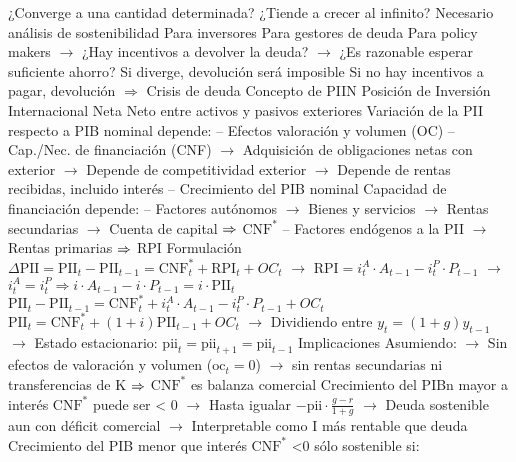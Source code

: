 \documentclass{nuevotema}
\begin{document}
\begin{esquemal}
				\4[] ¿Converge a una cantidad determinada?
				\4[] ¿Tiende a crecer al infinito?
				\4 Necesario análisis de sostenibilidad
				\4[] Para inversores
				\4[] Para gestores de deuda
				\4[] Para policy makers
				\4[] $\to$ ¿Hay incentivos a devolver la deuda?
				\4[] $\to$ ¿Es razonable esperar suficiente ahorro?
				\4[] Si diverge, devolución será imposible
				\4[] Si no hay incentivos a pagar, devolución
				\4[] $\Rightarrow$ Crisis de deuda
				\4 Concepto de PIIN
				\4[] Posición de Inversión Internacional Neta
				\4[] Neto entre activos y pasivos exteriores
				\4 Variación de la PII respecto a PIB nominal depende:
				\4[] -- Efectos valoración y volumen (OC)
				\4[] -- Cap./Nec. de financiación (CNF)
				\4[] $\to$ Adquisición de obligaciones netas con exterior
				\4[] $\to$ Depende de competitividad exterior
				\4[] $\to$ Depende de rentas recibidas, incluido interés
				\4[] -- Crecimiento del PIB nominal
				\4 Capacidad de financiación depende:
				\4[] -- Factores autónomos
				\4[] $\to$ Bienes y servicios
				\4[] $\to$ Rentas secundarias
				\4[] $\to$ Cuenta de capital
				\4[] $\Rightarrow$ $\text{CNF}^*$
				\4[] -- Factores endógenos a la PII
				\4[] $\to$ Rentas primarias
				\4[] $\Rightarrow$ RPI
			\3 Formulación
				\4 $\Delta \text{PII} = \text{PII}_t - \text{PII}_{t-1} = \text{CNF}^*_t + \text{RPI}_t + OC_t$
				\4[] $\to$ $\text{RPI} =i_t^A \cdot A_{t-1} - i_t^P\cdot P_{t-1}$
				\4[] $\to$ $i_t^A = i_t^P \Rightarrow i \cdot A_{t-1} - i\cdot P_{t-1} = i \cdot \text{PII}_t$
				\4[] $\text{PII}_t - \text{PII}_{t-1} = \text{CNF}^*_t + i_t^A \cdot A_{t-1} - i_t^P\cdot P_{t-1} + OC_t $
				\4[] $\text{PII}_t = \text{CNF}^*_t + (1+i) \text{PII}_{t-1} + OC_t$
				\4[] $\to$ Dividiendo entre $y_t = (1+g) y_{t-1}$
				\4[] 
				\4[] $\to$ Estado estacionario: $\text{pii}_t = \text{pii}_{t+1} = \text{pii}_{t-1}$
				\4[] 
			\3 Implicaciones
				\4[] Asumiendo:
				\4[] $\to$ Sin efectos de valoración y volumen ($\text{oc}_t=0$)
				\4[] $\to$ sin rentas secundarias ni transferencias de K
				\4[] $\Rightarrow$ $\text{CNF}^*$ es balanza comercial
				\4 Crecimiento del PIBn mayor a interés
				\4[] $\text{CNF}^*$ puede ser < 0
				\4[] $\to$ Hasta igualar $-\text{pii} \cdot \frac{g-r}{1+g}$
				\4[] $\to$ Deuda sostenible aun con déficit comercial
				\4[] $\to$ Interpretable como I más rentable que deuda
				\4 Crecimiento del PIB menor que interés
				\4[] $\text{CNF}^*$ <0 sólo sostenible si:

\end{esquemal}
\end{document}
